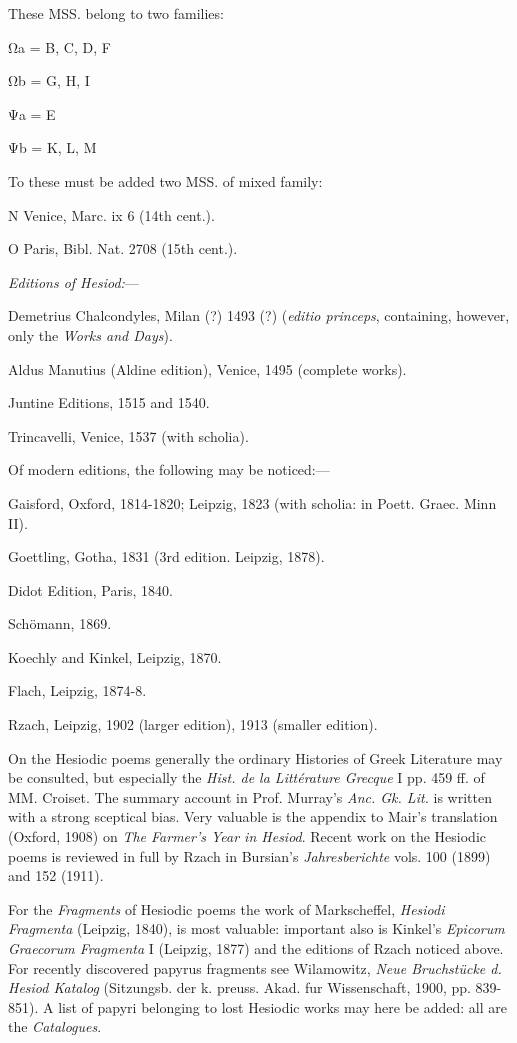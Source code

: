 These MSS. belong to two families:

Ωa = B, C, D, F

Ωb = G, H, I

Ψa = E

Ψb = K, L, M

To these must be added two MSS. of mixed family:

N Venice, Marc. ix 6 (14th cent.).

O Paris, Bibl. Nat. 2708 (15th cent.).

\emph{Editions of Hesiod:}—

Demetrius Chalcondyles, Milan (?) 1493 (?) (\emph{editio princeps}, containing,
however, only the \emph{Works and Days}).

Aldus Manutius
(Aldine edition), Venice, 1495 (complete works).

Juntine Editions, 1515 and 1540.

Trincavelli, Venice, 1537 (with scholia).

Of modern editions, the following may be noticed:—

Gaisford, Oxford, 1814-1820; Leipzig, 1823 (with scholia: in Poett. Graec. Minn
II).

Goettling, Gotha, 1831 (3rd edition. Leipzig, 1878).

Didot Edition, Paris, 1840.

Schömann, 1869.

Koechly and Kinkel, Leipzig, 1870.

Flach, Leipzig, 1874-8.

Rzach, Leipzig, 1902 (larger edition), 1913 (smaller edition).

On the Hesiodic poems generally the ordinary Histories of Greek Literature may
be consulted, but especially the \emph{Hist. de la Littérature Grecque} I pp.
459 ff. of MM. Croiset. The summary account in Prof. Murray’s \emph{Anc. Gk.
Lit.} is written with a strong sceptical bias. Very valuable is the appendix
to Mair’s translation (Oxford, 1908) on \emph{The Farmer’s Year in
Hesiod}. Recent work on the Hesiodic poems is reviewed in full by Rzach in
Bursian’s \emph{Jahresberichte} vols. 100 (1899) and 152 (1911).

For the \emph{Fragments} of Hesiodic poems the work of Markscheffel, \emph{Hesiodi
Fragmenta} (Leipzig, 1840), is most valuable: important also is
Kinkel’s \emph{Epicorum Graecorum Fragmenta} I (Leipzig, 1877) and the
editions of Rzach noticed above. For recently discovered papyrus fragments see
Wilamowitz, \emph{Neue Bruchstücke d. Hesiod Katalog} (Sitzungsb. der k.
preuss. Akad. fur Wissenschaft, 1900, pp. 839-851). A list of papyri belonging
to lost Hesiodic works may here be added: all are the \emph{Catalogues}.

